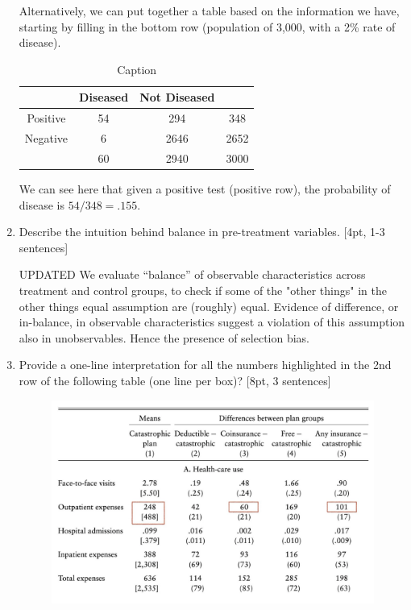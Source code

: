 \documentclass[answers]{exam}
\begin{document}
\begin{enumerate}
\begin{solution}
    Alternatively, we can put together a table based on the information we have, starting by filling in the bottom row (population of 3,000, with a 2\% rate of disease). 
    \begin{table}[H]
        \centering
        \begin{tabular}{c|c|c|c}
             & Diseased & Not Diseased &  \\
            \hline Positive & 54 & 294 & 348 \\ 
            \hline Negative & 6 & 2646 & 2652 \\ 
             \hline & 60 & 2940 & 3000 \\ 
             \hline
        \end{tabular}
        \caption{Caption}
        \label{tab:my_label}
    \end{table}
    We can see here that given a positive test (positive row), the probability of disease is $54/348 = .155$. \\ 
    
\end{solution}


\item Describe the intuition behind balance in pre-treatment variables. [4pt, 1-3 sentences] 
\begin{solution}
UPDATED We evaluate “balance” of observable characteristics across treatment and control groups, to check if some of the "other things" in the other things equal assumption are (roughly) equal. Evidence of difference, or in-balance, in observable characteristics suggest a violation of this assumption also in unobservables. Hence the presence of selection bias.
	\end{solution}


\item Provide a one-line interpretation for all the numbers highlighted in the 2nd row of the following table (one line per box)? [8pt, 3 sentences] 
\begin{figure}[H]
    \centering
    \includegraphics[width=6in]{Figures/midterm_table.png}
    \caption{}
    \label{}
\end{figure}


\end{enumerate}
\end{document}

